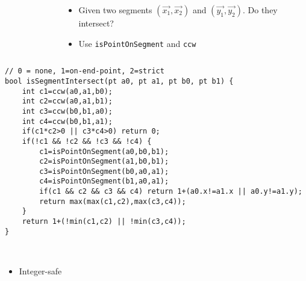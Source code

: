 \documentclass[12pt,t]{beamer}
\newcommand{\bi}{\begin{itemize}}
\newcommand{\ei}{\end{itemize}}
\begin{document}
\begin{frame}[fragile]
  \begin{columns}
    \begin{column}{0.5\textwidth}
      \begin{figure}
        \footnotesize
      \end{figure}
    \end{column}
    \begin{column}{0.55\textwidth}
      \bi
        \item Given two segments $(\vec{x_1},\vec{x_2})$ and $(\vec{y_1},\vec{y_2})$.
        Do they intersect?
        \item Use \texttt{isPointOnSegment} and \texttt{ccw}
      \ei
    \end{column}
  \end{columns}
\end{frame}




\begin{frame}[fragile]
  \vspace{20pt}
  \begin{verbatim}
// 0 = none, 1=on-end-point, 2=strict
bool isSegmentIntersect(pt a0, pt a1, pt b0, pt b1) {
    int c1=ccw(a0,a1,b0);
    int c2=ccw(a0,a1,b1);
    int c3=ccw(b0,b1,a0);
    int c4=ccw(b0,b1,a1);
    if(c1*c2>0 || c3*c4>0) return 0;
    if(!c1 && !c2 && !c3 && !c4) {
        c1=isPointOnSegment(a0,b0,b1);
        c2=isPointOnSegment(a1,b0,b1);
        c3=isPointOnSegment(b0,a0,a1);
        c4=isPointOnSegment(b1,a0,a1);
        if(c1 && c2 && c3 && c4) return 1+(a0.x!=a1.x || a0.y!=a1.y);
        return max(max(c1,c2),max(c3,c4));
    }
    return 1+(!min(c1,c2) || !min(c3,c4));
}
  \end{verbatim} 
  \ \\ \pause
  \bi
 	\item Integer-safe
  \ei
\end{frame}
\end{document}
